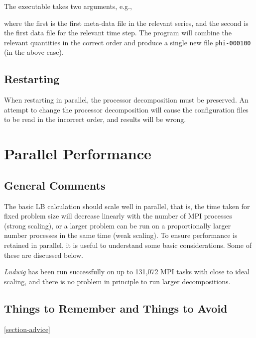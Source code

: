The executable takes two arguments, e.g.,


where  the first is the first meta-data file in the relevant series,
and the second is the first data file for the relevant time step. The
program will combine the relevant quantities in the correct order
and produce a single new file \texttt{phi-000100} (in the above case).

\subsection{Restarting}

When restarting in parallel, the processor decomposition must be
preserved. An attempt to change the processor decomposition will
cause the configuration files to be read in the incorrect order,
and results will be wrong.

\section{Parallel Performance}

\subsection{General Comments}

The basic LB calculation should scale well in parallel, that is,
the time taken for fixed problem size will decrease linearly
with the number of MPI processes (strong scaling), or a larger
problem can be run on a proportionally larger number processes
in the same time (weak scaling). To ensure performance is retained
in parallel, it is useful to understand some basic considerations.
Some of these are discussed below.

\textit{Ludwig} has been run successfully on up to 131,072 MPI
tasks with close to ideal scaling, and there is no problem in
principle to run larger decompositions.

\subsection{Things to Remember and Things to Avoid}
\ref{section-advice}

